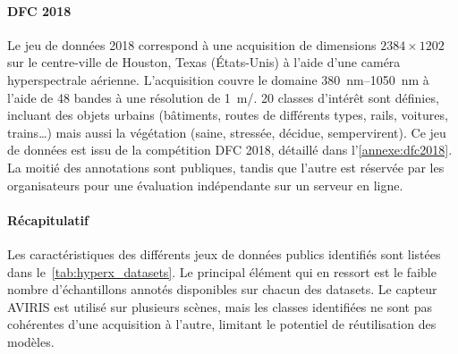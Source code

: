 
\paragraph{DFC 2018}
Le jeu de données  2018 correspond à une acquisition de dimensions $2384\times1202$ sur le centre-ville de Houston, Texas (États-Unis) à l'aide d'une caméra hyperspectrale aérienne. L'acquisition couvre le domaine \SIrange{380}{1050}{\nano\meter} à l'aide de 48 bandes à une résolution de \SI{1}{\meter/\px}. 20 classes d'intérêt sont définies, incluant des objets urbains (bâtiments, routes de différents types, rails, voitures, trains\dots) mais aussi la végétation (saine, stressée, décidue, sempervirent). Ce jeu de données est issu de la compétition \glsdesc{DFC} 2018, détaillé dans l'\cref{annexe:dfc2018}. La moitié des annotations sont publiques, tandis que l'autre est réservée par les organisateurs pour une évaluation indépendante sur un serveur en ligne.

\paragraph{Récapitulatif}

Les caractéristiques des différents jeux de données publics identifiés sont listées dans le~\cref{tab:hyperx_datasets}. Le principal élément qui en ressort est le faible nombre d'échantillons annotés disponibles sur chacun des datasets. Le capteur \gls{AVIRIS} est utilisé sur plusieurs scènes, mais les classes identifiées ne sont pas cohérentes d'une acquisition à l'autre, limitant le potentiel de réutilisation des modèles.

